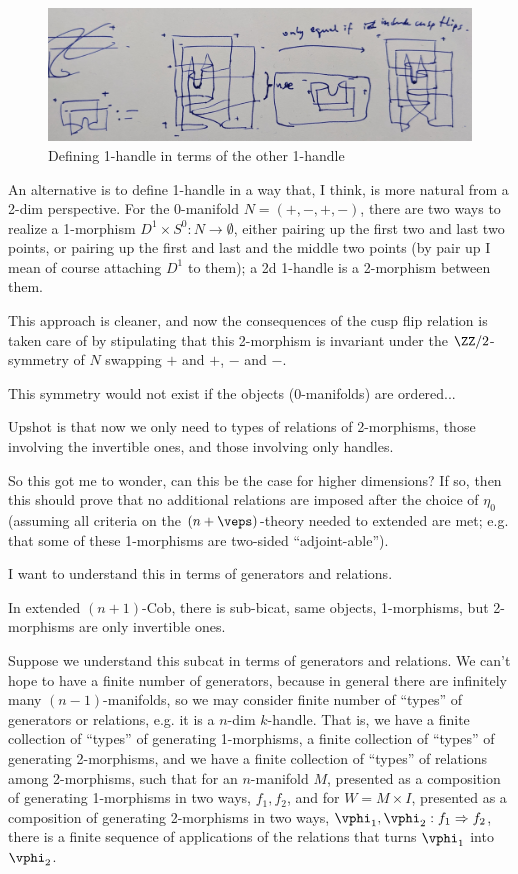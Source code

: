 \documentclass[12pt]{article}
\begin{document}
\begin{figure}[ht]
\includegraphics[width=12cm]{fig-defn-1-hdl-alt.jpg}
\caption{Defining 1-handle in terms of the other 1-handle}
\label{f:defn-1-hdl-alt}
\end{figure}

An alternative is to define 1-handle in a way that,
I think, is more natural from a 2-dim perspective.
For the 0-manifold $N = (+,-,+,-)$,
there are two ways to realize a 1-morphism
$D^1 \times S^0 : N \to \emptyset$,
either pairing up the first two and last two points,
or pairing up the first and last and the middle two points
(by pair up I mean of course attaching $D^1$ to them);
a 2d 1-handle is a 2-morphism between them.

This approach is cleaner, and now the consequences
of the cusp flip relation
is taken care of by stipulating that this 2-morphism
is invariant under the $\ZZ/2$-symmetry of $N$
swapping $+$ and $+$, $-$ and $-$.

This symmetry would not exist if the objects (0-manifolds)
are ordered...

Upshot is that now we only need to types of relations of 2-morphisms,
those involving the invertible ones, and those involving only handles.

So this got me to wonder, can this be the case for higher dimensions?
If so, then this should prove that no additional relations are imposed
after the choice of $\eta_0$
(assuming all criteria on the $(n+\veps)$-theory needed to extended
are met; e.g. that some of these 1-morphisms are two-sided ``adjoint-able'').

I want to understand this in terms of generators and relations.

In extended $(n+1)$-Cob, there is sub-bicat,
same objects, 1-morphisms, but 2-morphisms are only invertible ones.

Suppose we understand this subcat in terms of generators and relations.
We can't hope to have a finite number of generators,
because in general there are infinitely many $(n-1)$-manifolds,
so we may consider finite number of ``types'' of generators or relations,
e.g. it is a $n$-dim $k$-handle.
That is, we have a finite collection of ``types'' of generating 1-morphisms,
a finite collection of ``types'' of generating 2-morphisms,
and we have a finite collection of ``types'' of relations among 2-morphisms,
such that for an $n$-manifold $M$,
presented as a composition of generating 1-morphisms in two ways, $f_1,f_2$,
and for $W = M \times I$,
presented as a composition of generating 2-morphisms in two ways,
$\vphi_1,\vphi_2: f_1 \Rightarrow f_2$,
there is a finite sequence of applications of the relations
that turns $\vphi_1$ into $\vphi_2$.
\end{document}
